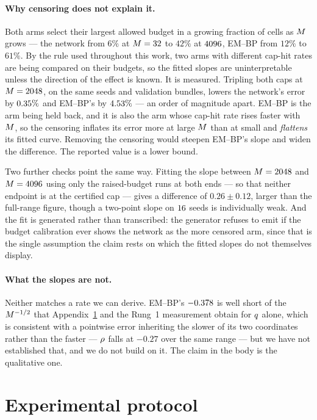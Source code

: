 \paragraph{Why censoring does not explain it.} Both arms select their largest
allowed budget in a growing fraction of cells as $M$ grows --- the network
from $6\%$ at $M=32$ to $42\%$ at $4096$, EM--BP from $12\%$ to $61\%$.
By the rule used throughout this work, two arms with different cap-hit rates are
being compared on their budgets, so the fitted slopes are uninterpretable unless
the direction of the effect is known. It is measured. Tripling both caps at
$M=2048$, on the same seeds and validation bundles, lowers the network's
error by $0.35\%$ and EM--BP's by $4.53\%$ --- an order of
magnitude apart. EM--BP is the arm being held back, and it is also the arm whose
cap-hit rate rises faster with $M$, so the censoring inflates its error more
at large $M$ than at small and \emph{flattens} its fitted curve. Removing the
censoring would steepen EM--BP's slope and widen the difference. The reported
value is a lower bound.

Two further checks point the same way. Fitting the slope between $M=2048$
and $M=4096$ using only the raised-budget runs at both ends --- so that
neither endpoint is at the certified cap --- gives a difference of $0.26 \pm 0.12$,
larger than the full-range figure, though a two-point slope on $16$ seeds
is individually weak. And the fit is generated rather than transcribed: the
generator refuses to emit if the budget calibration ever shows the network as the
more censored arm, since that is the single assumption the claim rests on which
the fitted slopes do not themselves display.

\paragraph{What the slopes are not.} Neither matches a rate we can derive.
EM--BP's $-0.378$ is well short of the $M^{-1/2}$ that
Appendix~\ref{app:protocol} and the Rung~1 measurement obtain for $q$ alone,
which is consistent with a pointwise error inheriting the slower of its two
coordinates rather than the faster --- $\rho$ falls at $-0.27$ over the same
range --- but we have not established that, and we do not build on it. The claim
in the body is the qualitative one.

\section{Experimental protocol}
\label{app:protocol}

